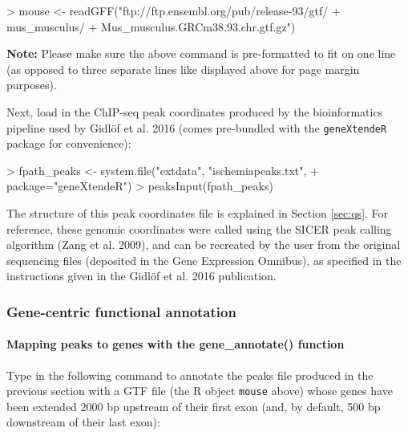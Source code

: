 \documentclass[12pt]{article}
\begin{document}
\begin{Schunk}
\begin{Sinput}
> mouse <- readGFF("ftp://ftp.ensembl.org/pub/release-93/gtf/
+                       mus_musculus/
+                       Mus_musculus.GRCm38.93.chr.gtf.gz")
\end{Sinput}
\end{Schunk}

{\bf{Note:}} Please make sure the above command is pre-formatted to fit on one line (as opposed to three separate lines like displayed above for page margin purposes).

Next, load in the ChIP-seq peak coordinates produced by the bioinformatics pipeline used by Gidl\"{o}f et al. 2016 (comes pre-bundled with the \texttt{geneXtendeR} package for convenience):

\begin{Schunk}
\begin{Sinput}
> fpath_peaks <- system.file("extdata", "ischemiapeaks.txt", 
+                            package="geneXtendeR")
> peaksInput(fpath_peaks)
\end{Sinput}
\end{Schunk}

The structure of this peak coordinates file is explained in Section \ref{sec:qs}.  For reference, these genomic coordinates were called using the SICER peak calling algorithm (Zang et al. 2009), and can be recreated by the user from the original sequencing files (deposited in the Gene Expression Omnibus), as specified in the instructions given in the Gidl\"{o}f et al. 2016 publication.  

\subsubsection{Gene-centric functional annotation} \label{sec:centric}

\paragraph{Mapping peaks to genes with the gene\_annotate() function}

Type in the following command to annotate the peaks file produced in the previous section with a GTF file (the R object \texttt{mouse} above) whose genes have been extended 2000 bp upstream of their first exon (and, by default, 500 bp downstream of their last exon):
\end{document}
